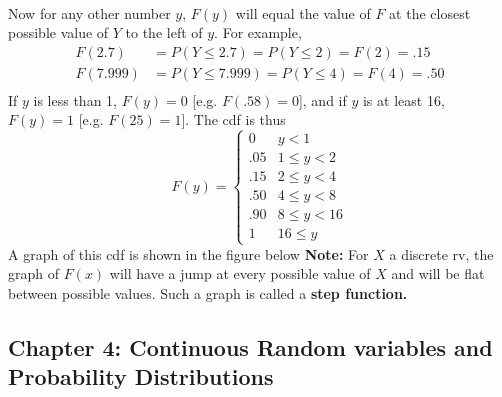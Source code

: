 \documentclass{report}
\begin{document}
\begin{itemize}
\[\begin{aligned}
                \end{aligned}
            \]
            Now for any other number \( y \), \( F(y) \) will equal the value of \( F \) at the closest possible value of \( Y \) to the left of \( y \). For example,
            \[
                \begin{aligned}
                    F(2.7) &= P(Y \leq 2.7) = P(Y \leq 2) = F(2) = .15 \\
                    F(7.999) &= P(Y \leq 7.999) = P(Y \leq 4) = F(4) = .50 \\
                \end{aligned}
            \]
            \bigbreak \noindent 
            If \( y \) is less than 1, \( F(y) = 0 \) [e.g. \( F(.58) = 0 \)], and if \( y \) is at least 16, \( F(y) = 1 \) [e.g. \( F(25) = 1 \)]. The cdf is thus
            \[
                F(y) =
                \begin{cases} 
                    0 & y < 1 \\
                    .05 & 1 \leq y < 2 \\
                    .15 & 2 \leq y < 4 \\
                    .50 & 4 \leq y < 8 \\
                    .90 & 8 \leq y < 16 \\
                    1 & 16 \leq y
                \end{cases}
            \]
            A graph of this cdf is shown in the figure below
            \bigbreak \noindent 
            \bigbreak \noindent 
            \textbf{Note:} For $X$ a discrete rv, the graph of $F(x)$ will have a jump at every possible
            value of $X$ and will be flat between possible values. Such a graph is called a \textbf{step function.}

    \end{itemize}

    \pagebreak \bigbreak \noindent 
    \subsection{Chapter 4: Continuous Random variables and Probability Distributions}
    \bigbreak \noindent 
\end{document}

